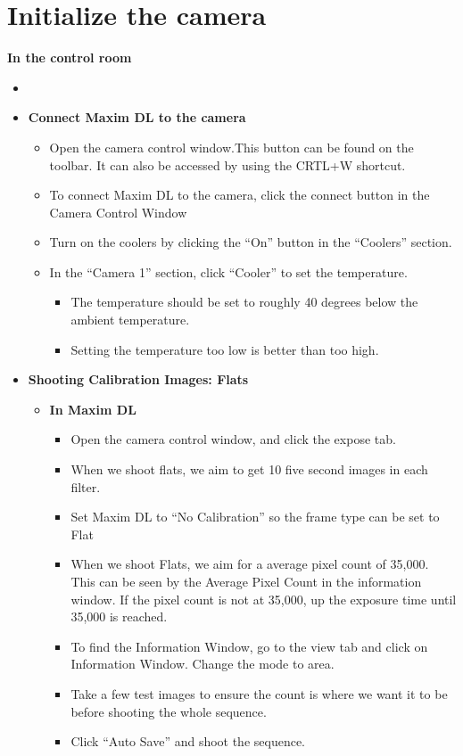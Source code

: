 \documentclass[letterpaper, 12pt]{report}
\begin{document}
\section{Initialize the camera}
\large \textbf{In the control room}
\begin{itemize}
\item []
\end{itemize}
\begin{itemize}
	\item \textbf{Connect Maxim DL to the camera}
	\begin{itemize}
		\item Open the camera control window.This button can be found on the toolbar. It can also be accessed by using the CRTL+W shortcut.
		\item To connect Maxim DL to the camera, click the connect button in the Camera Control Window
		\item Turn on the coolers by clicking the ``On'' button in the ``Coolers'' section.
		\item In the ``Camera 1'' section, click ``Cooler'' to set the temperature.
		\begin{itemize}
			\item The temperature should be set to roughly 40 degrees below the ambient temperature.
			\item Setting the temperature too low is better than too high.
		\end{itemize}
	\end{itemize}
\end{itemize}
	\begin{itemize}
		\item {\large \textbf{Shooting Calibration Images: Flats}}
		\begin{itemize}
			\item \large \textbf{In Maxim DL}
			\begin{itemize}
				\item Open the camera control window, and click the expose tab.
				\item When we shoot flats, we aim to get 10 five second images in each filter.
				\item Set Maxim DL to ``No Calibration'' so the frame type can be set to Flat

				\item When we shoot Flats, we aim for a average pixel count of 35,000. This can be seen by the Average Pixel Count in the information window. If the pixel count is not at 35,000, up the exposure time until 35,000 is reached.
				\item To find the Information Window, go to the view tab and click on Information Window. Change the mode to area.
				\item Take a few test images to ensure the count is where we want it to be before shooting the whole sequence.
				\item Click ``Auto Save'' and shoot the sequence.
			\end{itemize}
		\end{itemize}
	\end{itemize}
\end{document}
